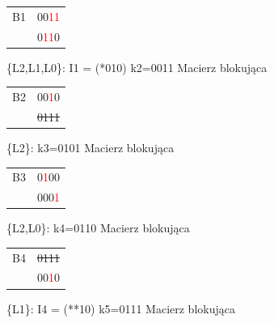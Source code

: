 \documentclass[]{article}
\begin{document}
\begin{tabular}[r]{|c|c|}
\hline
    B1 & 00\textcolor{red}{1}\textcolor{red}{1}  \\
      & 0\textcolor{red}{1}\textcolor{red}{1}0 \\
      
 \hline 
\end{tabular}
\newline
\newline
\{L2,L1,L0\}: I1 = (*010)
\newline
\newline
k2=0011
\newline
Macierz blokująca
\newline
\begin{tabular}[r]{|c|c|}
\hline
    B2 & 00\textcolor{red}{1}0   \\
      & \sout{0111} \\
 \hline 
\end{tabular}
\newline
\newline
\{L2\}: 
\newline
\newline
k3=0101
\newline
Macierz blokująca
\newline
\begin{tabular}[r]{|c|c|}
\hline
    B3 &  0\textcolor{red}{1}00 \\
      & 000\textcolor{red}{1} \\
 \hline 
\end{tabular}
\newline
\newline
\{L2,L0\}: 
\newline
\newline
k4=0110
\newline
Macierz blokująca
\newline
\begin{tabular}[r]{|c|c|}
\hline
    B4 & \sout{0111} \\
      & 00\textcolor{red}{1}0 \\
 \hline 
\end{tabular}
\newline
\newline
\{L1\}: I4 = (**10)
\newline
\newline
k5=0111
\newline
Macierz blokująca
\newline
\end{document}
